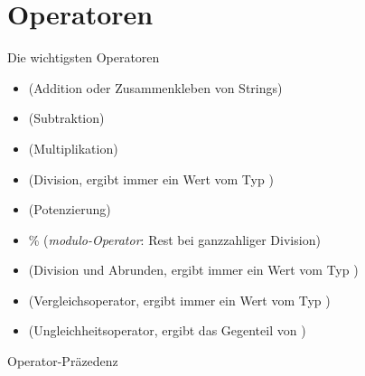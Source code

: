 \section{Operatoren}

\begin{frame}
\begin{block}{Die wichtigsten Operatoren}
	\begin{itemize}
		\item \pybw{+} (Addition oder Zusammenkleben von Strings)
		\item \pybw{-} (Subtraktion)
		\item \pybw{*} (Multiplikation)
		\item \pybw{/} (Division, ergibt immer ein Wert vom Typ )
		\item \pybw{**} (Potenzierung)
		\item \% (\textit{modulo-Operator}: Rest bei ganzzahliger Division)
		\item \pybw{//} (Division und Abrunden, ergibt immer ein Wert vom Typ )
		\item \pybw{==} (Vergleichsoperator, ergibt immer ein Wert vom Typ )
		\item \pybw{!=} (Ungleichheitsoperator, ergibt das Gegenteil von \pybw{==})
	\end{itemize}
\end{block}
\end{frame}

\begin{frame}
\begin{block}{Operator-Präzedenz}

\end{block}
\end{frame}

